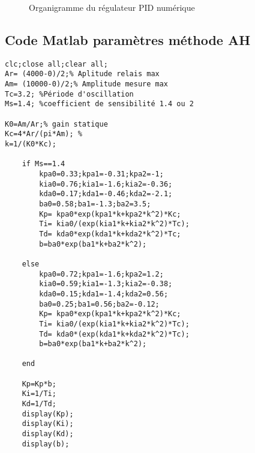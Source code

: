 \begin{figure}[h]
{
}
	\caption{Organigramme du régulateur PID numérique}
	\label{fig: Organigramme du régulateur PID numérique}
\end{figure}

\newpage

\subsection{Code Matlab paramètres méthode AH}
\begin{lstlisting}[style=Matlab-bw,basicstyle=\ttfamily\scriptsize,caption={Code Matlab: calcul des paramètres du régulateur selon la méthode AH}, label={code Matlab2}]
%% Calcul des paramètres PID par l'autoajustage selon Astrm et Hagglund
clc;close all;clear all;
Ar= (4000-0)/2;% Aplitude relais max
Am= (10000-0)/2;% Amplitude mesure max
Tc=3.2; %Période d'oscillation
Ms=1.4; %coefficient de sensibilité 1.4 ou 2

K0=Am/Ar;% gain statique 
Kc=4*Ar/(pi*Am); % 
k=1/(K0*Kc);

	if Ms==1.4
		kpa0=0.33;kpa1=-0.31;kpa2=-1;
		kia0=0.76;kia1=-1.6;kia2=-0.36;
		kda0=0.17;kda1=-0.46;kda2=-2.1;
		ba0=0.58;ba1=-1.3;ba2=3.5;
		Kp= kpa0*exp(kpa1*k+kpa2*k^2)*Kc;
		Ti= kia0/(exp(kia1*k+kia2*k^2)*Tc);
		Td= kda0*exp(kda1*k+kda2*k^2)*Tc;
		b=ba0*exp(ba1*k+ba2*k^2);
	
	else
		kpa0=0.72;kpa1=-1.6;kpa2=1.2;
		kia0=0.59;kia1=-1.3;kia2=-0.38;
		kda0=0.15;kda1=-1.4;kda2=0.56;
		ba0=0.25;ba1=0.56;ba2=-0.12;
		Kp= kpa0*exp(kpa1*k+kpa2*k^2)*Kc;
		Ti= kia0/(exp(kia1*k+kia2*k^2)*Tc);
		Td= kda0*(exp(kda1*k+kda2*k^2)*Tc);
		b=ba0*exp(ba1*k+ba2*k^2);
	
	end

	Kp=Kp*b;
	Ki=1/Ti;
	Kd=1/Td;
	display(Kp);
	display(Ki);
	display(Kd);
	display(b);
\end{lstlisting}

